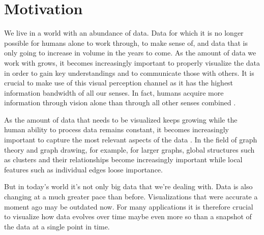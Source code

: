 \section{Motivation}
\label{sect:motivation}

We live in a world with an abundance of data. Data for which it is no longer possible for humans alone to work through, to make sense of, and data that is only going to increase in volume in the years to come. As the amount of data we work with grows, it becomes increasingly important to properly visualize the data in order to gain key understandings and to communicate those with others. It is crucial to make use of this visual perception channel as it has the highest information bandwidth of all our senses. In fact, humans acquire more information through vision alone than through all other senses combined \cite{ware2019information}.

As the amount of data that needs to be visualized keeps growing while the human ability to process data remains constant, it becomes increasingly important to capture the most relevant aspects of the data \cite{dachsbacher2019visualisierung}. In the field of graph theory and graph drawing, for example, for larger graphs, global structures such as clusters and their relationships become increasingly important while local features such as individual edges loose importance.


But in today's world it's not only big data that we're dealing with. Data is also changing at a much greater pace than before. Visualizations that were accurate a moment ago may be outdated now. For many applications it is therefore crucial to visualize how data evolves over time \emdash{} maybe even more so than a snapshot of the data at a single point in time.

